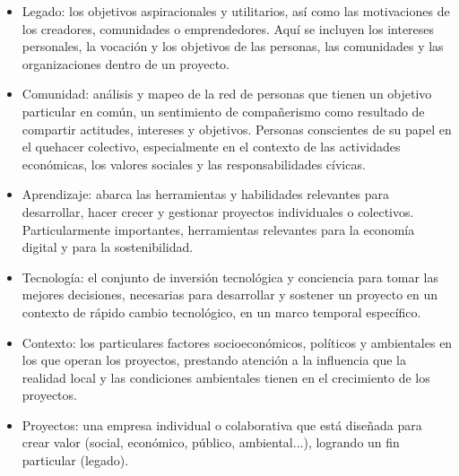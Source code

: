 \documentclass[spanish]{textolivre}
\begin{document}
\begin{itemize}
    \item Legado: los objetivos aspiracionales y utilitarios, así como las motivaciones de los creadores, comunidades o emprendedores. Aquí se incluyen los intereses personales, la vocación y los objetivos de las personas, las comunidades y las organizaciones dentro de un proyecto.
    \item Comunidad: análisis y mapeo de la red de personas que tienen un objetivo particular en común, un sentimiento de compañerismo como resultado de compartir actitudes, intereses y objetivos. Personas conscientes de su papel en el quehacer colectivo, especialmente en el contexto de las actividades económicas, los valores sociales y las responsabilidades cívicas.
    \item Aprendizaje: abarca las herramientas y habilidades relevantes para desarrollar, hacer crecer y gestionar proyectos individuales o colectivos. Particularmente importantes, herramientas relevantes para la economía digital y para la sostenibilidad.
    \item Tecnología: el conjunto de inversión tecnológica y conciencia para tomar las mejores decisiones, necesarias para desarrollar y sostener un proyecto en un contexto de rápido cambio tecnológico, en un marco temporal específico. 
    \item Contexto: los particulares factores socioeconómicos, políticos y ambientales en los que operan los proyectos, prestando atención a la influencia que la realidad local y las condiciones ambientales tienen en el crecimiento de los proyectos.
    \item Proyectos: una empresa individual o colaborativa que está diseñada para crear valor (social, económico, público, ambiental...), logrando un fin particular (legado).
\end{itemize}
\end{document}
